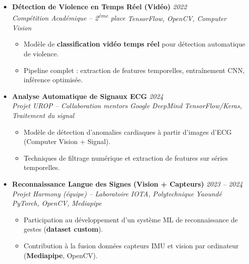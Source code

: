 \documentclass[a4paper,11pt]{article}
\begin{document}
\begin{itemize}[leftmargin=*, label={-}]
\item \textbf{Détection de Violence en Temps Réel (Vidéo)} \hfill \textit{2022} \\
\textit{Compétition Académique -- 2\textsuperscript{ème} place} \hfill \textit{TensorFlow, OpenCV, Computer Vision}
\vspace{-2pt}
    \begin{itemize}[leftmargin=0.4cm, nosep, label=\tiny$\bullet$]
        \item \small{Modèle de \textbf{classification vidéo temps réel} pour détection automatique de violence.}
        \item \small{Pipeline complet : extraction de features temporelles, entraînement CNN, inférence optimisée.}
    \end{itemize}
\vspace{6pt}

\item \textbf{Analyse Automatique de Signaux ECG} \hfill \textit{2024} \\
\textit{Projet UROP -- Collaboration mentors Google DeepMind} \hfill \textit{TensorFlow/Keras, Traitement du signal}
\vspace{-2pt}
    \begin{itemize}[leftmargin=0.4cm, nosep, label=\tiny$\bullet$]
        \item \small{Modèle de détection d'anomalies cardiaques à partir d'images d'ECG (Computer Vision + Signal).}
        \item \small{Techniques de filtrage numérique et extraction de features sur séries temporelles.}
    \end{itemize}
\vspace{4pt}

\item \textbf{Reconnaissance Langue des Signes (Vision + Capteurs)} \hfill \textit{2023 -- 2024} \\
\textit{Projet Harmony (équipe) -- Laboratoire IOTA, Polytechnique Yaoundé} \hfill \textit{PyTorch, OpenCV, Mediapipe}
\vspace{-2pt}
    \begin{itemize}[leftmargin=0.4cm, nosep, label=\tiny$\bullet$]
        \item \small{Participation au développement d'un système ML de reconnaissance de gestes (\textbf{dataset custom}).}
        \item \small{Contribution à la fusion données capteurs IMU et vision par ordinateur (\textbf{Mediapipe}, OpenCV).}
    \end{itemize}
\vspace{6pt}

\end{itemize}
\end{document}
